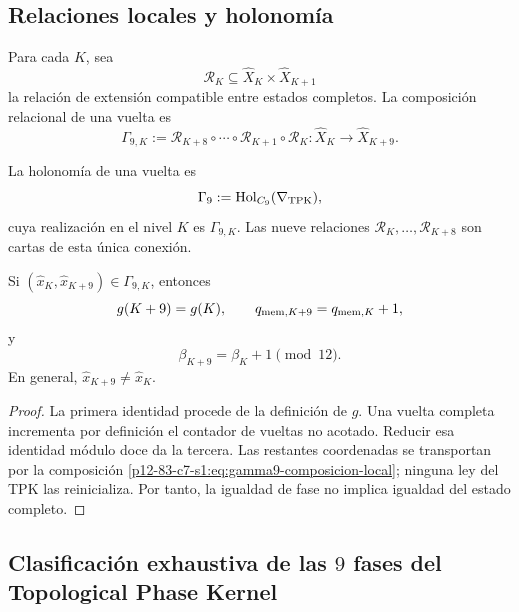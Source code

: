 \subsection{Relaciones locales y holonomía}

Para cada \(K\), sea
\[
 \mathcal R_K\subseteq
 \widehat X_K\times\widehat X_{K+1}
\]
la relación de extensión compatible entre estados completos. La composición
relacional de una vuelta es
\begin{equation}
 \Gamma_{9,K}
 :=\mathcal R_{K+8}\circ\cdots\circ\mathcal R_{K+1}\circ\mathcal R_K
 :\widehat X_K\longrightarrow\widehat X_{K+9}.
\label{p12-83-c7-s1:eq:gamma9-composicion-local}
\end{equation}

\begin{definition}
\label{p12-83-c7-s1:def:holonomia-nonadica}
La holonomía de una vuelta es
\[
 \Gamma_9:=\operatorname{Hol}_{C_9}(\nabla_{\rm TPK}),
\]
cuya realización en el nivel \(K\) es
\(\Gamma_{9,K}\). Las nueve relaciones \(\mathcal R_K,\ldots,
\mathcal R_{K+8}\) son cartas de esta única conexión.
\end{definition}

\begin{theorem}
\label{p12-83-c7-s1:thm:retorno-nonadico-sin-reinicio}
Si \((\widehat x_K,\widehat x_{K+9})\in\Gamma_{9,K}\), entonces
\[
 g(K+9)=g(K),
 \qquad
 q_{{\rm mem},K+9}=q_{{\rm mem},K}+1,
\]
y
\[
 \beta_{K+9}=\beta_K+1\pmod{12}.
\]
En general, \(\widehat x_{K+9}\neq\widehat x_K\).
\end{theorem}

\begin{proof}
La primera identidad procede de la definición de \(g\). Una vuelta completa
incrementa por definición el contador de vueltas no acotado. Reducir esa
identidad módulo doce da la tercera. Las restantes coordenadas se
transportan por la composición \cref{p12-83-c7-s1:eq:gamma9-composicion-local}; ninguna
ley del TPK las reinicializa. Por tanto, la igualdad de fase no implica
igualdad del estado completo.
\end{proof}

\subsection{Clasificación exhaustiva de las \(9\) fases del Topological Phase Kernel}

